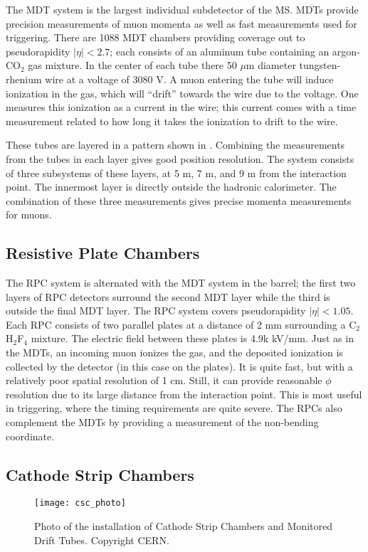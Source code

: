 The MDT system is the largest individual subdetector of the MS.
MDTs provide precision measurements of muon momenta as well as fast measurements used for triggering.
There are 1088 MDT chambers providing coverage out to pseudorapidity $|\eta| < 2.7 $; each consists of an aluminum tube containing an argon-CO$_2$ gas mixture.
In the center of each tube there 50 $\mu$m diameter tungsten-rhenium wire at a voltage of 3080 V.
A muon entering the tube will induce ionization in the gas, which will ``drift'' towards the wire due to the voltage.
One measures this ionization as a current in the wire; this current comes with a time measurement related to how long it takes the ionization to drift to the wire.

These tubes are layered in a pattern shown in .
Combining the measurements from the tubes in each layer gives good position resolution.
The system consists of three subsystems of these layers, at 5 m, 7 m, and 9 m from the interaction point.
The innermost layer is directly outside the hadronic calorimeter.
The combination of these three measurements gives precise momenta measurements for muons.

\subsection{Resistive Plate Chambers}

The RPC system is alternated with the MDT system in the barrel; the first two layers of RPC detectors surround the second MDT layer while the third is outside the final MDT layer.
The RPC system covers pseudorapidity $|\eta| < 1.05 $.
Each RPC consists of two parallel plates at a distance of 2 mm surrounding a C$_2$H$_2$F$_4$ mixture.
The electric field between these plates is 4.9k kV/mm.
Just as in the MDTs, an incoming muon ionizes the gas, and the deposited ionization is collected by the detector (in this case on the plates).
It is quite fast, but with a relatively poor spatial resolution of 1 cm.
Still, it can provide reasonable $\phi$ resolution due to its large distance from the interaction point.
This is most useful in triggering, where the timing requirements are quite severe.
The RPCs also complement the MDTs by providing a measurement of the non-bending coordinate.

\subsection{Cathode Strip Chambers}
\begin{figure}
\caption{Photo of the installation of Cathode Strip Chambers and Monitored Drift Tubes. Copyright CERN.} \label{fig:csc_photo}
\texttt{[image: csc\_photo]}
\end{figure}

